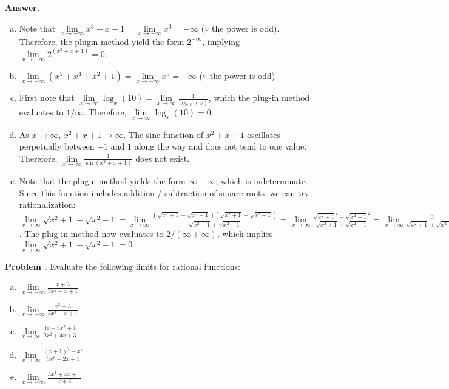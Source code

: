 \documentclass[11pt,letterpaper]{article}
\newcounter{problem}
\newcommand{\problem}{
	\stepcounter{problem}%
	\noindent \textbf{Problem \theproblem. }%
}
\newcommand{\answer}{\noindent \textbf{Answer. }}
\begin{document}
\answer
\begin{enumerate}[(a)]
    \item Note that $\lim\limits_{x \to -\infty} x^3+x+1 = \lim\limits_{x \to -\infty} x^3 = -\infty$ ($\because$ the power is odd).  Therefore, the plugin method yield the form $2^{-\infty}$, implying $\lim\limits_{x \to -\infty} 2^{(x^3+x+1)} = 0$.
    \item $\lim\limits_{x \to -\infty} (x^5+x^4+x^2+1) = \lim\limits_{x \to -\infty} x^5 = -\infty$  ($\because$ the power is odd)
    \item First note that $\lim\limits_{x \to \infty} \log_{x}(10) = \lim\limits_{x \to \infty} \frac{1}{\log_{10}(x)}$, which the plug-in method evaluates to $1/\infty$. Therefore, $\lim\limits_{x \to \infty} \log_{x}(10) = 0$.
    \item As $x \to \infty$, $x^2+x+1 \to \infty$.  The sine function of $x^2+x+1$ oscillates perpetually between $-1$ and $1$ along the way and does not tend to one value.  Therefore, $\lim\limits_{x \to \infty} \frac{1}{\sin(x^2+x+1)}$ does not exist.
    \item Note that the plugin method yields the form $\infty-\infty$, which is indeterminate.  Since this function includes addition / subtraction of square roots, we can try rationalization: $\lim\limits_{x \to \infty} \sqrt{x^2 + 1} - \sqrt{x^2 - 1} = \lim\limits_{x \to \infty} \frac{(\sqrt{x^2 + 1} - \sqrt{x^2 - 1})(\sqrt{x^2 + 1} + \sqrt{x^2 - 1})}{\sqrt{x^2 + 1} + \sqrt{x^2 - 1}} = \lim\limits_{x \to \infty} \frac{\sqrt{x^2 + 1}^2 - \sqrt{x^2 - 1}^2}{\sqrt{x^2 + 1}+\sqrt{x^2 - 1}} = \lim\limits_{x \to \infty} \frac{2}{\sqrt{x^2 + 1}+\sqrt{x^2 - 1}}$.  The plug-in method now evaluates to $2/(\infty + \infty)$, which implies $\lim\limits_{x \to \infty} \sqrt{x^2 + 1} - \sqrt{x^2 - 1} = 0$
\end{enumerate}\vspace{6mm}

\problem Evaluate the following limits for rational functions:
\begin{enumerate}[(a)]
    \item $\lim\limits_{x \to -\infty} \frac{x+3}{3x^2-x+1}$
    \item $\lim\limits_{x \to -\infty} \frac{x^5+3}{3x^7-x+1}$
    \item $\lim\limits_{x \to \infty} \frac{3x+5x^2+1}{2x^2+4x+3}$
    \item $\lim\limits_{x \to \infty} \frac{(x+1)^7-x^7}{3x^6+2x+1}$
    \item $\lim\limits_{x \to -\infty} \frac{3x^4+4x+1}{x+3}$
\end{enumerate}\vspace{6mm}
\end{document}

